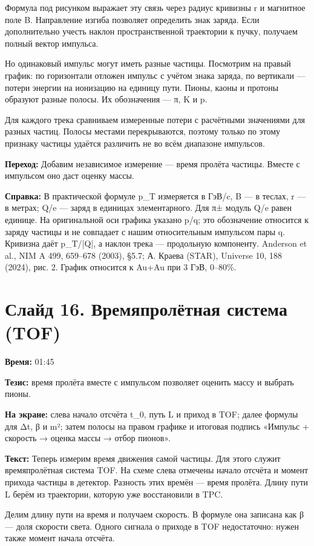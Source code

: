 \documentclass[11pt,a4paper]{article}
\begin{document}
Формула под рисунком выражает эту связь через радиус кривизны r и магнитное поле B. Направление изгиба позволяет определить знак заряда. Если дополнительно учесть наклон пространственной траектории к пучку, получаем полный вектор импульса.

Но одинаковый импульс могут иметь разные частицы. Посмотрим на правый график: по горизонтали отложен импульс с учётом знака заряда, по вертикали — потери энергии на ионизацию на единицу пути. Пионы, каоны и протоны образуют разные полосы. Их обозначения — π, K и p.

Для каждого трека сравниваем измеренные потери с расчётными значениями для разных частиц. Полосы местами перекрываются, поэтому только по этому признаку частицы удаётся различить не во всём диапазоне импульсов.

\textbf{Переход:} Добавим независимое измерение — время пролёта частицы. Вместе с импульсом оно даст оценку массы.

\textbf{Справка:} В практической формуле p\_T измеряется в ГэВ/c, B — в теслах, r — в метрах; Q/e — заряд в единицах элементарного. Для π± модуль Q/e равен единице. На оригинальной оси графика указано p/q; это обозначение относится к заряду частицы и не совпадает с нашим относительным импульсом пары q. Кривизна даёт p\_T/|Q|, а наклон трека — продольную компоненту. Anderson et al., NIM A 499, 659–678 (2003), §5.7; А. Краева (STAR), Universe 10, 188 (2024), рис. 2. График относится к Au+Au при 3 ГэВ, 0–80\%.

\clearpage
\section*{Слайд 16. Времяпролётная система (TOF)}
\textbf{Время:} 01:45

\textbf{Тезис:} время пролёта вместе с импульсом позволяет оценить массу и выбрать пионы.

\textbf{На экране:} слева начало отсчёта t\_0, путь L и приход в TOF; далее формулы для Δt, β и m²; затем полосы на правом графике и итоговая подпись «Импульс + скорость → оценка массы → отбор пионов».

\textbf{Текст:} Теперь измерим время движения самой частицы. Для этого служит времяпролётная система TOF. На схеме слева отмечены начало отсчёта и момент прихода частицы в детектор. Разность этих времён — время пролёта. Длину пути L берём из траектории, которую уже восстановили в TPC.

Делим длину пути на время и получаем скорость. В формуле она записана как β — доля скорости света. Одного сигнала о приходе в TOF недостаточно: нужен также момент начала отсчёта.
\end{document}
